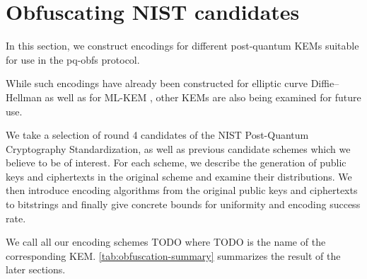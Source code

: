 \chapter{Obfuscating NIST candidates}\label{ch:obfuscation}

In this section, we construct encodings for different post-quantum KEMs suitable for use in the pq-obfs protocol.

While such encodings have already been constructed for elliptic curve Diffie–Hellman \cite{CCS:BHKL13, tor-dev-udh, USENIX:WWGH11} as well as for ML-KEM \cite{CCS:GunSteVei24}, other KEMs are also being examined for future use.

We take a selection of round 4 candidates of the NIST Post-Quantum Cryptography Standardization, as well as previous candidate schemes which we believe to be of interest.
For each scheme, we describe the generation of public keys and ciphertexts in the original scheme and examine their distributions. We then introduce encoding algorithms from the original public keys and ciphertexts to bitstrings and finally give concrete bounds for uniformity and encoding success rate.

We call all our encoding schemes TODO where TODO is the name of the corresponding KEM. \cref{tab:obfuscation-summary} summarizes the result of the later sections.

